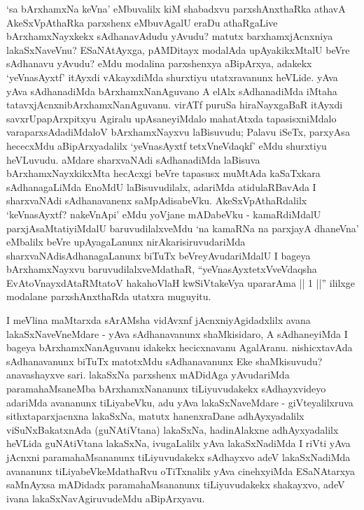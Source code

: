\begin{artha}
`sa bArxhamxNa keVna' eMbuvalilx kiM shabadxvu parxshAnxthaRka athavA AkeSxVpAthaRka parxshenx eMbuvAgalU eraDu athaRgaLive \ndash  bArxhamxNayxkekx sAdhanavAdudu yAvudu? matutx barxhamxjAcnxniya lakaSxNaveVnu? ESaNAtAyxga, pAMDitayx modalAda upAyakikxMtalU beVre sAdhanavu yAvudu? eMdu modalina parxshenxya aBipArxya, adakekx `yeVnasAyxtf' itAyxdi vAkayxdiMda shurxtiyu utatxravanunx heVLide. yAva yAva sAdhanadiMda bArxhamxNanAguvano A elAlx sAdhanadiMda iMtaha tatavxjAcnxnibArxhamxNanAguvanu. virATf puruSa hiraNayxgaBaR itAyxdi savxrUpapArxpitxyu Agiralu upAsaneyiMdalo mahatAtxda tapasisxniMdalo varaparxsAdadiMdaloV bArxhamxNayxvu laBisuvudu; Palavu iSeTx, parxyAsa hececxMdu aBipArxyadalilx `yeVnasAyxtf tetxVneVdaqkf' eMdu shurxtiyu heVLuvudu. aMdare sharxvaNAdi sAdhanadiMda laBisuva bArxhamxNayxkikxMta hecAcxgi beVre tapasusx muMtAda kaSaTxkara sAdhanagaLiMda EnoMdU laBisuvudilalx, adariMda atidulaRBavAda I sharxvaNAdi sAdhanavanenx saMpAdisabeVku. AkeSxVpAthaRdalilx `keVnasAyxtf? nakeVnApi' eMdu yoVjane mADabeVku - kamaRdiMdalU parxjAsaMtatiyiMdalU baruvudilalxveMdu `na kamaRNa na parxjayA dhaneVna' eMbalilx beVre upAyagaLanunx nirAkarisiruvudariMda sharxvaNAdisAdhanagaLanunx biTuTx beVreyAvudariMdalU I bageya bArxhamxNayxvu baruvudilalxveMdathaR, ``yeVnasAyxtetxVveVdaqsha EvAtoV\s nayxdAtaRMtatoV hakahoVlaH kwSiVtakeVya upararAma || 1 ||'' ililxge modalane parxshAnxthaRda utatxra muguyitu.
\end{artha}

\begin{artha}
I meVlina maMtarxda sArAMsha \mdash  vidAvxnf jAcnxniyAgidadxlilx avana lakaSxNaveVneMdare - yAva sAdhanavanunx shaMkisidaro, A sAdhaneyiMda I bageya bArxhamxNanAguvanu idakekx hecicxnavanu AgalAranu. nishicxtavAda sAdhanavanunx biTuTx matotxMdu sAdhanavanunx Eke shaMkisuvudu? anavashayxve sari. lakaSxNa parxshenx mADidAga yAvudariMda paramahaMsaneMba bArxhamxNananunx tiLiyuvudakekx sAdhayxvideyo adariMda avananunx tiLiyabeVku, adu yAva lakaSxNaveMdare - giVteyalilxruva sithxtaparxjacnxna lakaSxNa, matutx hanenxraDane adhAyxyadalilx viSuNxBakatxnAda (guNAtiVtana) lakaSxNa, hadinAlakxne adhAyxyadalilx heVLida guNAtiVtana lakaSxNa, ivugaLalilx yAva lakaSxNadiMda I riVti yAva jAcnxni paramahaMsananunx tiLiyuvudakekx sAdhayxvo adeV lakaSxNadiMda avananunx tiLiyabeVkeMdathaRvu oTiTxnalilx yAva cinehxyiMda ESaNAtarxya saMnAyxsa mADidadx paramahaMsananunx tiLiyuvudakekx shakayxvo, adeV ivana lakaSxNavAgiruvudeMdu aBipArxyavu.
\end{artha}

